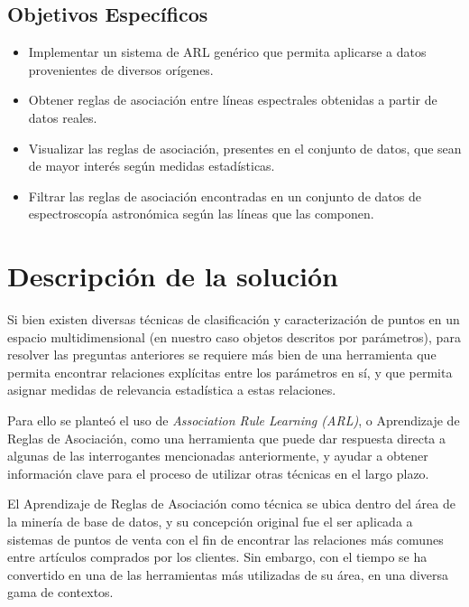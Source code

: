 \begin{intro}
\subsection*{Objetivos Específicos}

\begin{itemize}
  \item Implementar un sistema de ARL genérico que permita aplicarse a datos provenientes de diversos orígenes.
  \item Obtener reglas de asociación entre líneas espectrales obtenidas a partir de datos reales.
  \item Visualizar las reglas de asociación, presentes en el conjunto de datos, que sean de mayor interés según medidas estadísticas. 
  \item Filtrar las reglas de asociación encontradas en un conjunto de datos de espectroscopía astronómica según las líneas que las componen.
\end{itemize}

\section*{Descripción de la solución}

Si bien existen diversas técnicas de clasificación y caracterización de puntos en un espacio multidimensional (en nuestro caso objetos descritos por parámetros), para resolver las preguntas anteriores se requiere más bien de una herramienta que permita encontrar relaciones explícitas entre los parámetros en sí, y que permita asignar medidas de relevancia estadística a estas relaciones.

Para ello se planteó el uso de \textit{Association Rule Learning (ARL)}, o Aprendizaje de Reglas de Asociación, como una herramienta que puede dar respuesta directa a algunas de las interrogantes mencionadas anteriormente, y ayudar a obtener información clave para el proceso de utilizar otras técnicas en el largo plazo.

El Aprendizaje de Reglas de Asociación como técnica se ubica dentro del área de la minería de base de datos, y su concepción original fue el ser aplicada a sistemas de puntos de venta con el fin de encontrar las relaciones más comunes entre artículos comprados por los clientes. Sin embargo, con el tiempo se ha convertido en una de las herramientas más utilizadas de su área, en una diversa gama de contextos.


\end{intro}
